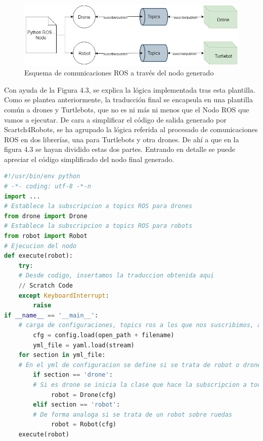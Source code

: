 \begin{figure}[H]
    \centering
    \includegraphics[scale=0.6]{img/s4r-diagrama-robot.png}
  	\caption{Esquema de comunicaciones ROS a través del nodo generado}
  	\label{fig:s4r-esquema-4}
\end{figure}

Con ayuda de la Figura 4.3, se explica la lógica implementada tras esta plantilla.\\

Como se plantea anteriormente, la traducción final se encapsula en una plantilla común a drones y Turtlebots, que no es ni más ni menos que el Nodo ROS que vamos a ejecutar. De cara a simplificar el código de salida generado por Scartch4Robots, se ha agrupado la lógica referida al procesado de comunicaciones ROS en dos librerías, una para Turtlebots y otra drones. De ahí a que en la figura 4.3 se hayan dividido estas dos partes. Entrando en detalle se puede apreciar el código simplificado del nodo final generado.\\

\begin{lstlisting}[language=python,firstnumber=1]
#!/usr/bin/env python
# -*- coding: utf-8 -*-n
import ...
# Establece la subscripcion a topics ROS para drones
from drone import Drone 
# Establece la subscripcion a topics ROS para robots
from robot import Robot 
# Ejecucion del nodo  
def execute(robot):
    try:
    # Desde codigo, insertamos la traduccion obtenida aqui 
    // Scratch Code
    except KeyboardInterrupt:
        raise       
if __name__ == '__main__':
    # carga de configuraciones, topics ros a los que nos suscribimos, a traves de fichero yml
        cfg = config.load(open_path + filename)
        yml_file = yaml.load(stream) 
    for section in yml_file:
    # En el yml de configuracion se define si se trata de robot o drone.
        if section == 'drone':
        # Si es drone se inicia la clase que hace la subscripcion a todos los topics ROS
             robot = Drone(cfg)
        elif section == 'robot':
    	# De forma analoga si se trata de un robot sobre ruedas
             robot = Robot(cfg)
    execute(robot)

\end{lstlisting}

